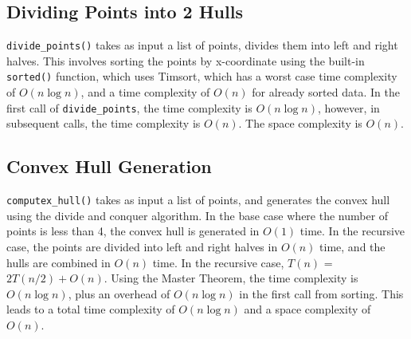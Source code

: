 \documentclass[12pt]{article}
\begin{document}
\subsection{Dividing Points into 2 Hulls}
\texttt{divide\_points()} takes as input a list of points, divides them
into left and right halves. This involves sorting the points by x-coordinate
using the built-in \texttt{sorted()} function, which uses Timsort, which has
a worst case time complexity of $O(n \log n)$, and a time complexity of
$O(n)$ for already sorted data. In the first call of \texttt{divide\_points},
the time complexity is $O(n \log n)$, however, in subsequent calls, the time
complexity is $O(n)$. The space complexity is $O(n)$.

\subsection{Convex Hull Generation}
\texttt{computex\_hull()} takes as input a list of points, and generates
the convex hull using the divide and conquer algorithm. In the base case
where the number of points is less than 4, the convex hull is generated
in $O(1)$ time. In the recursive case, the points are divided into left
and right halves in $O(n)$ time, and the hulls are combined in $O(n)$ time.
In the recursive case, $T(n)$ = $2T(n/2) + O(n)$. Using the Master Theorem,
the time complexity is $O(n \log n)$, plus an overhead of $O(n \log n)$ in
the first call from sorting. This leads to a total time complexity of
$O(n \log n)$ and a space complexity of $O(n)$.
\end{document}
